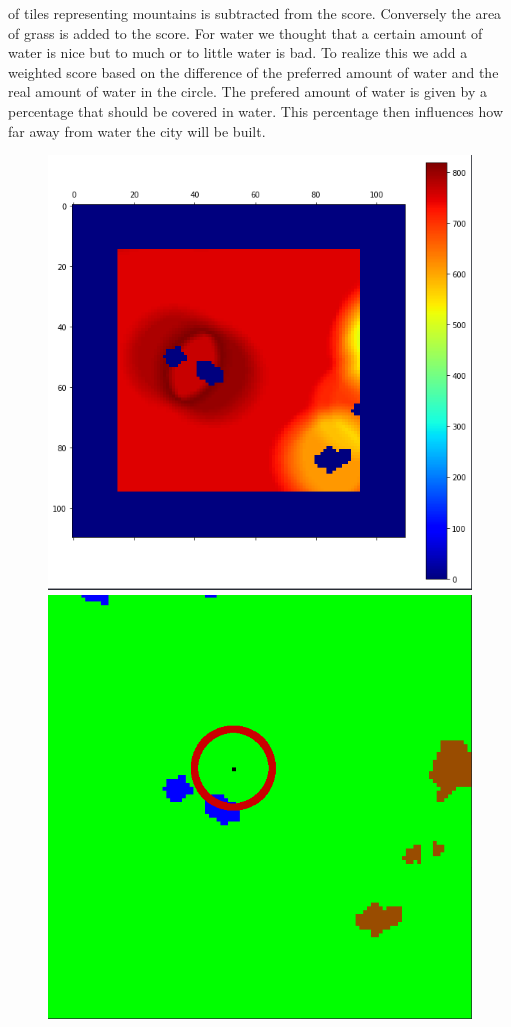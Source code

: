 \documentclass{scrartcl}
\begin{document}
of tiles representing mountains is subtracted from the score. Conversely the area
of grass is added to the score. For water we thought that a certain amount of water
is nice but to much or to little water is bad. To realize this we add a weighted score based
on the difference of the preferred amount of water and the real amount of water in
the circle. The prefered amount of water is given by a percentage that should be
covered in water. This percentage then influences how far away from water the
city will be built.
\begin{figure}
  \centering
  \includegraphics[scale = 0.25]{heatmap_citycenter}
  \includegraphics[scale = 0.2]{terrain_citycenter_circle}

\end{figure}
\end{document}
